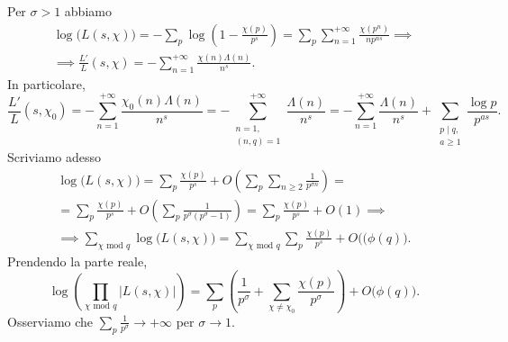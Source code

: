 \begin{oss}
  Per $\sigma>1$ abbiamo
  \begin{gather*}
    \log\big(L(s,\chi)\big)=-\sum_p \log\left(1-\frac{\chi(p)}{p^s}\right)=\sum_p\sum_{n=1}^{+\infty} \frac{\chi(p^n)}{np^{ns}} \implies \\
    \implies \frac{L'}{L}(s,\chi)=-\sum_{n=1}^{+\infty} \frac{\chi(n)\Lambda(n)}{n^s}.
  \end{gather*}
  In particolare,
  $$\frac{L'}{L}(s,\chi_0)=-\sum_{n=1}^{+\infty} \frac{\chi_0(n)\Lambda(n)}{n^s}=-\sum_{\substack{n=1, \\ (n,q)=1}}^{+\infty} \frac{\Lambda(n)}{n^s}=-\sum_{n=1}^{+\infty} \frac{\Lambda(n)}{n^s}+\sum_{\substack{p \mid q, \\a \ge 1}} \frac{\log{p}}{p^{as}}.$$
  Scriviamo adesso
  \begin{gather*}
    \log\big(L(s,\chi)\big)=\sum_p \frac{\chi(p)}{p^s}+O\left(\sum_p \sum_{n \ge 2} \frac{1}{p^{\sigma n}}\right)=\\
    =\sum_p \frac{\chi(p)}{p^s}+O\left(\sum_p \frac{1}{p^{\sigma}(p^{\sigma}-1)}\right)=\sum_p \frac{\chi(p)}{p^s}+O(1) \implies \\
    \implies \sum_{\chi\text{ mod }q}\log\big(L(s,\chi)\big)=\sum_{\chi\text{ mod }q}\sum_p \frac{\chi(p)}{p^s}+O(\big(\phi(q)\big).
  \end{gather*}
  Prendendo la parte reale,
  $$\log\left(\prod_{\chi\text{ mod }q}|L(s,\chi)|\right)=\sum_p\left(\frac{1}{p^{\sigma}}+\sum_{\chi\not=\chi_0}\frac{\chi(p)}{p^{\sigma}}\right)+O\big(\phi(q)\big).$$
  Osserviamo che $\displaystyle \sum_p\frac{1}{p^{\sigma}} \longrightarrow +\infty$ per $\sigma \longrightarrow 1$.
\end{oss}
